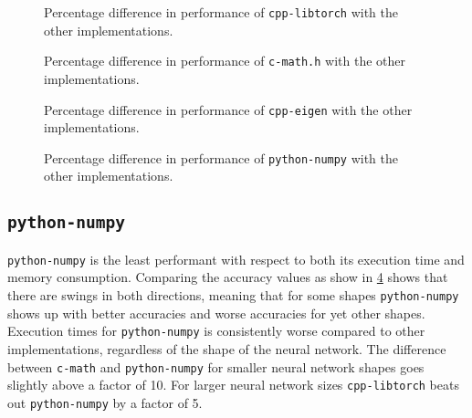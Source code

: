 \begin{figure}[ht]
	\centering
	\scalebox{0.81}{}
	\scalebox{0.81}{}
	\caption{Percentage difference in performance of \texttt{cpp-libtorch} with the other implementations.}
	\label{fig:comparison-libtorch}
\end{figure}

\begin{figure}[ht]
	\centering
	\scalebox{0.81}{}
	\scalebox{0.81}{}
	\caption{Percentage difference in performance of \texttt{c-math.h} with the other implementations.}
	\label{fig:comparison-cmath}
\end{figure}

\begin{figure}[ht]
	\centering
	\scalebox{0.81}{}
	\scalebox{0.81}{}
	\caption{Percentage difference in performance of \texttt{cpp-eigen} with the other implementations.}
	\label{fig:comparison-eigen}
\end{figure}

\begin{figure}[ht]
	\centering
	\scalebox{0.81}{}
	\scalebox{0.81}{}
	\caption{Percentage difference in performance of \texttt{python-numpy} with the other implementations.}
	\label{fig:comparison-numpy}
\end{figure}

\subsection{\texttt{python-numpy}}

\texttt{python-numpy} is the least performant with respect to both its execution time and memory consumption. Comparing the accuracy values as show in \ref{fig:comparison-numpy} shows that there are swings in both directions, meaning that for some shapes \texttt{python-numpy} shows up with better accuracies and worse accuracies for yet other shapes. Execution times for \texttt{python-numpy} is consistently worse compared to other implementations, regardless of the shape of the neural network. The difference between \texttt{c-math} and \texttt{python-numpy} for smaller neural network shapes goes slightly above a factor of 10. For larger neural network sizes \texttt{cpp-libtorch} beats out \texttt{python-numpy} by a factor of 5.

